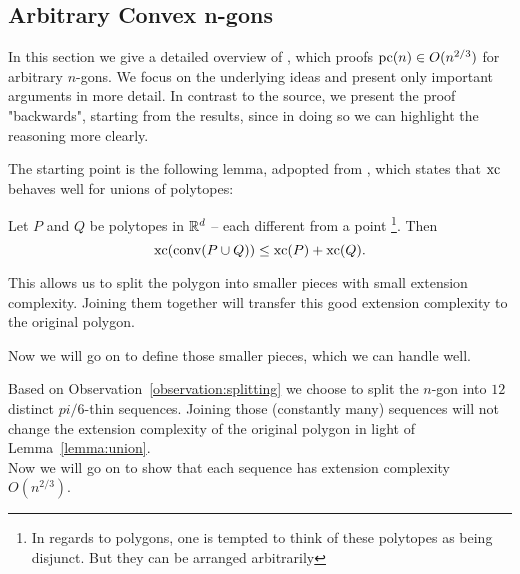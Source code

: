 \subsection{Arbitrary Convex n-gons}

In this section we give a detailed overview of \cite{shitov2020sublinear}, which proofs $\operatorname{pc}(n) \in O(n^{2/3})$ for arbitrary $n$-gons. 
We focus on the underlying ideas and present only important arguments in more detail. In contrast to the source, we present the proof "backwards", starting from the results, since in doing so we can highlight the reasoning more clearly.


The starting point is the following lemma, adpopted from \cite[Proposition 3.1.1]{weltge2015sizes}, which states that $\operatorname{xc}$ behaves well for unions of polytopes:
\begin{lemma}\label{lemma:union}
  Let $P$ and $Q$ be polytopes in $\mathbb{R}^d$ -- each different from a point \footnote{In regards to polygons, one is tempted to think of these polytopes as being disjunct. But they can be arranged arbitrarily}. Then $$\operatorname{xc}(\operatorname{conv}(P \cup Q)) \leq \operatorname{xc}(P) + \operatorname{xc}(Q) .$$
\end{lemma}

This allows us to split the polygon into smaller pieces with small extension complexity. Joining them together will transfer this good extension complexity to the original polygon.

Now we will go on to define those smaller pieces, which we can handle well.

\begin{definition}
\end{definition}
\begin{observation}\label{observation:splitting}
\end{observation}

Based on Observation~\ref{observation:splitting} we choose to split the $n$-gon into $12$ distinct $pi/6$-thin sequences. Joining those (constantly many) sequences will not change the extension complexity of the original polygon in light of Lemma~\ref{lemma:union}. \\
Now we will go on to show that each sequence has extension complexity $O(n^{2/3})$.

